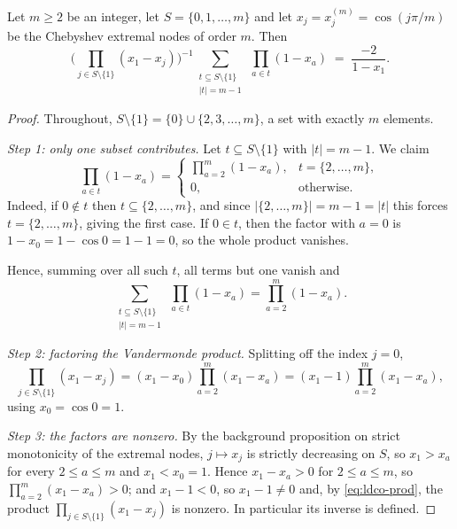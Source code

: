 \begin{lemma}
Let $m\ge2$ be an integer, let $S=\{0,1,\dots,m\}$ and let
$x_j=x^{(m)}_j=\cos(j\pi/m)$ be the Chebyshev extremal nodes of order $m$. Then
\[
  \Biggl(\prod_{j\in S\setminus\{1\}}(x_1-x_j)\Biggr)^{-1}
  \sum_{\substack{t\subseteq S\setminus\{1\}\\ \lvert t\rvert=m-1}}
    \ \prod_{a\in t}(1-x_a)
  \;=\;\frac{-2}{1-x_1}.
\]
\end{lemma}
\begin{proof}
Throughout, $S\setminus\{1\}=\{0\}\cup\{2,3,\dots,m\}$, a set with exactly $m$
elements.

\emph{Step 1: only one subset contributes.} Let $t\subseteq S\setminus\{1\}$ with
$\lvert t\rvert=m-1$. We claim
\[
  \prod_{a\in t}(1-x_a)=
  \begin{cases}
    \prod_{a=2}^{m}(1-x_a), & t=\{2,\dots,m\},\\[2pt]
    0, & \text{otherwise.}
  \end{cases}
\]
Indeed, if $0\notin t$ then $t\subseteq\{2,\dots,m\}$, and since
$\lvert\{2,\dots,m\}\rvert=m-1=\lvert t\rvert$ this forces $t=\{2,\dots,m\}$,
giving the first case. If $0\in t$, then the factor with $a=0$ is
$1-x_0=1-\cos0=1-1=0$, so the whole product vanishes.

Hence, summing over all such $t$, all terms but one vanish and
\begin{equation}\label{eq:ldco-sum}
  \sum_{\substack{t\subseteq S\setminus\{1\}\\ \lvert t\rvert=m-1}}
    \ \prod_{a\in t}(1-x_a)=\prod_{a=2}^{m}(1-x_a).
\end{equation}

\emph{Step 2: factoring the Vandermonde product.} Splitting off the index
$j=0$,
\begin{equation}\label{eq:ldco-prod}
  \prod_{j\in S\setminus\{1\}}(x_1-x_j)
  =(x_1-x_0)\prod_{a=2}^{m}(x_1-x_a)
  =(x_1-1)\prod_{a=2}^{m}(x_1-x_a),
\end{equation}
using $x_0=\cos0=1$.

\emph{Step 3: the factors are nonzero.} By the background proposition on strict
monotonicity of the extremal nodes, $j\mapsto x_j$ is strictly decreasing on
$S$, so $x_1>x_a$ for every $2\le a\le m$ and $x_1<x_0=1$. Hence
$x_1-x_a>0$ for $2\le a\le m$, so $\prod_{a=2}^{m}(x_1-x_a)>0$; and
$x_1-1<0$, so $x_1-1\ne0$ and, by \eqref{eq:ldco-prod}, the product
$\prod_{j\in S\setminus\{1\}}(x_1-x_j)$ is nonzero. In particular its inverse is
defined.


\end{proof}
